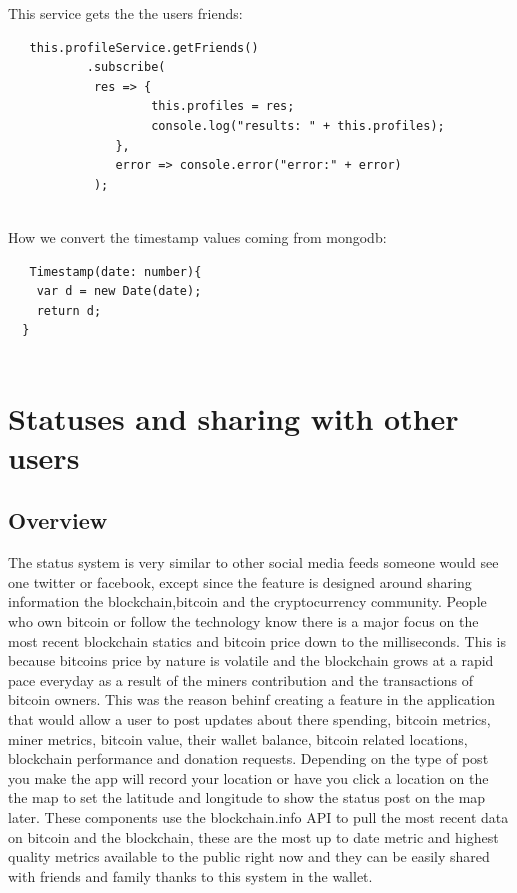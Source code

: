 This service gets the the users friends:
\begin{lstlisting}
   this.profileService.getFriends()
           .subscribe(
            res => {
                    this.profiles = res;
                    console.log("results: " + this.profiles);
               },
               error => console.error("error:" + error)
            );
  
\end{lstlisting}

How we convert the timestamp values coming from mongodb:
\begin{lstlisting}
   Timestamp(date: number){
    var d = new Date(date);
    return d;
  }
  
\end{lstlisting}

\section{Statuses and sharing with other users}

\subsection{Overview}
The status system is very similar to other social media feeds someone would see one twitter or facebook, except since the feature is designed around sharing information the blockchain,bitcoin and the cryptocurrency community. People who own bitcoin or follow the technology know there is a major focus on the most recent blockchain statics and bitcoin price down to the milliseconds. This is because bitcoins price by nature is volatile and the blockchain grows at a rapid pace everyday as a result of the miners contribution and the transactions of bitcoin owners. This was the reason behinf creating a feature in the application that would allow a user to post updates about there spending, bitcoin metrics, miner metrics, bitcoin value, their wallet balance, bitcoin related locations, blockchain performance and donation requests. Depending on the type of post you make the app will record your location or have you click a location on the the map to set the latitude and longitude to show the status post on the map later. These components use the blockchain.info API to pull the most recent data on bitcoin and the blockchain, these are the most up to date metric and highest quality metrics available to the public right now and they can be easily shared with friends and family thanks to this system in the wallet.


